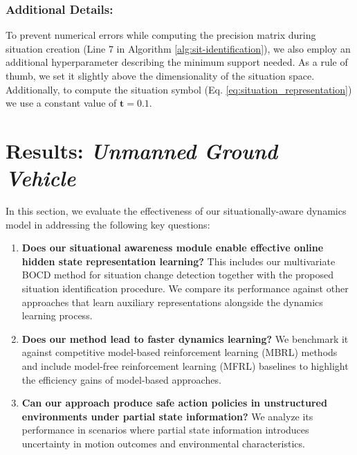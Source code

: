 \documentclass[Afour,sageh,times]{sagej}
\theoremstyle{lemma}
\begin{document}
\subsubsection{Additional Details:}

To prevent numerical errors while computing the precision matrix during situation creation (Line 7 in Algorithm \ref{alg:sit-identification}), we also employ an additional hyperparameter describing the minimum support needed. As a rule of thumb, we set it slightly above the dimensionality of the situation space. Additionally, to compute the situation symbol (Eq. \ref{eq:situation_representation}) we use a constant value of $\mathbf{t} = \mathbf{0.1}$.  


\section{Results: \textit{Unmanned Ground Vehicle}} \label{sec:results_ugv}

In this section, we evaluate the effectiveness of our situationally-aware dynamics model in addressing the following key questions:  

\begin{enumerate}

    \item \textbf{Does our situational awareness module enable effective online hidden state representation learning?} 
    This includes our multivariate BOCD method for situation change detection together with the proposed situation identification procedure.
    We compare its performance against other approaches that learn auxiliary representations alongside the dynamics learning process.  

    \item \textbf{Does our method lead to faster dynamics learning?}  
    We benchmark it against competitive model-based reinforcement learning (MBRL) methods and include model-free reinforcement learning (MFRL) baselines to highlight the efficiency gains of model-based approaches.  

    \item \textbf{Can our approach produce safe action policies in unstructured environments under partial state information?}  
    We analyze its performance in scenarios where partial state information introduces uncertainty in motion outcomes and environmental characteristics.  
\end{enumerate} 
\end{document}

